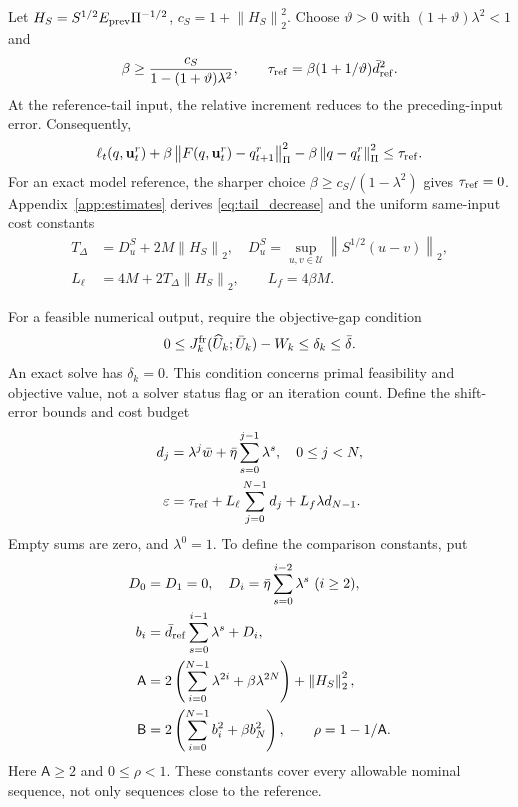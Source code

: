 \documentclass[journal]{IEEEtran}
\newcommand{\vu}{\mathbf{u}}
\newcommand{\norm}[1]{\left\lVert #1\right\rVert}
\begin{document}
Let $H_S=S^{1/2}E_{\rm prev}\Pi^{-1/2}$, $c_S=1+\norm{H_S}_2^2$. Choose $\vartheta>0$ with $(1+\vartheta)\lambda^2<1$ and
\begin{equation}
\beta\ge\frac{c_S}{1-(1+\vartheta)\lambda^2},\qquad
\tau_{\rm ref}=\beta(1+1/\vartheta)\bar d_{\rm ref}^2.
\label{eq:terminal_weight}
\end{equation}
At the reference-tail input, the relative increment reduces to the preceding-input error. Consequently,
\begin{equation}
\begin{split}
\ell_t(q,\vu_t^r)+\beta\norm{F(q,\vu_t^r)-q_{t+1}^r}_\Pi^2
-\beta\norm{q-q_t^r}_\Pi^2\le\tau_{\rm ref}.
\end{split}
\label{eq:tail_decrease}
\end{equation}
For an exact model reference, the sharper choice $\beta\ge c_S/(1-\lambda^2)$ gives $\tau_{\rm ref}=0$. Appendix~\ref{app:estimates} derives \eqref{eq:tail_decrease} and the uniform same-input cost constants
\begin{equation}
\begin{split}
T_\Delta&=D_u^S+2M\norm{H_S}_2,\quad
D_u^S=\sup_{u,v\in\mathcal U}\norm{S^{1/2}(u-v)}_2,\\
L_\ell&=4M+2T_\Delta\norm{H_S}_2,\qquad L_f=4\beta M.
\end{split}
\label{eq:cost_continuity}
\end{equation}

For a feasible numerical output, require the objective-gap condition
\begin{equation}
0\le J_k^{\rm fr}(\widehat U_k;\bar U_k)-W_k
\le\delta_k\le\bar\delta.
\label{eq:solver_gap}
\end{equation}
An exact solve has $\delta_k=0$. This condition concerns primal feasibility and objective value, not a solver status flag or an iteration count. Define the shift-error bounds and cost budget
\begin{align}
d_j&=\lambda^j\bar w+\bar\eta\sum_{s=0}^{j-1}\lambda^s,
\quad 0\le j<N,\label{eq:shift_error}\\
\varepsilon&=\tau_{\rm ref}+L_\ell\sum_{j=0}^{N-1}d_j
+L_f\lambda d_{N-1}.
\label{eq:epsilon_closed_loop}
\end{align}
Empty sums are zero, and $\lambda^0=1$. To define the comparison constants, put
\begin{equation}
\begin{split}
D_0&=D_1=0,\quad D_i=\bar\eta\sum_{s=0}^{i-2}\lambda^s\ (i\ge2),\\
b_i&=\bar d_{\rm ref}\sum_{s=0}^{i-1}\lambda^s+D_i,\\
\mathsf A&=2\left(\sum_{i=0}^{N-1}\lambda^{2i}+\beta\lambda^{2N}\right)
+\norm{H_S}_2^2,\\
\mathsf B&=2\left(\sum_{i=0}^{N-1}b_i^2+\beta b_N^2\right),\qquad
\rho=1-1/\mathsf A.
\end{split}
\label{eq:value_constants}
\end{equation}
Here $\mathsf A\ge2$ and $0\le\rho<1$. These constants cover every allowable nominal sequence, not only sequences close to the reference.
\end{document}

